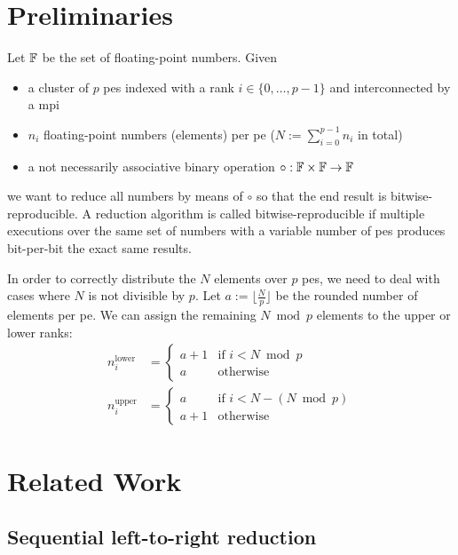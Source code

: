 \section{Preliminaries}
\label{sec:Preliminaries}
Let $\mathbb{F}$ be the set of floating-point numbers. Given
\begin{itemize}
\item a cluster of $p$ \glspl{pe} indexed with a rank $i \in \{0, \ldots, p - 1\}$ and interconnected by a \gls{mpi}
\item $n_i$ floating-point numbers (elements) per \gls{pe} ($N := \sum_{i=0}^{p-1} n_i$ in total)
\item a not necessarily associative binary operation $\circ: \mathbb{F} \times \mathbb{F} \rightarrow \mathbb{F}$
\end{itemize}
we want to reduce all numbers by means of $\circ$ so that the end result is bitwise-reproducible.
A reduction algorithm is called bitwise-reproducible if multiple executions over the same set of numbers with a variable
number of \glspl{pe} produces bit-per-bit the exact same results.

In order to correctly distribute the $N$ elements over $p$ \glspl{pe}, we need to deal with cases where $N$ is not divisible by $p$.
Let $a := \lfloor \tfrac{N}{p} \rfloor$ be the rounded number of elements per \gls{pe}.
We can assign the remaining $N \bmod p$ elements to the upper or lower ranks:
\begin{align}
\label{eq:lowerDistribution}
n_i^{\textrm{lower}} &= \begin{cases}
    a + 1 & \textrm{if } i < N \bmod p \\
    a & \textrm{otherwise}
\end{cases} \\
\label{eq:upperDistribution}
n_i^{\textrm{upper}} &= \begin{cases}
    a & \textrm{if } i < N - (N \bmod p) \\
    a + 1 & \textrm{otherwise}
\end{cases}
\end{align}

\section{Related Work}
\label{sec:RelatedWork}

\subsection{Sequential left-to-right reduction}
\label{sec:SequentialLeftToRightReduction}


